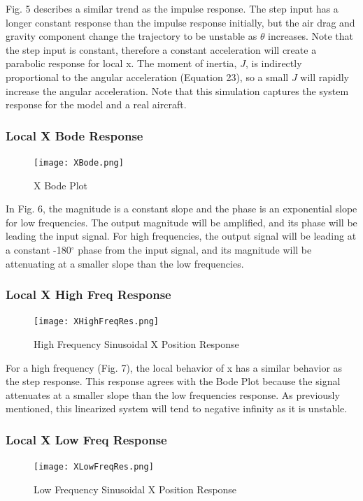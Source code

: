 \documentclass[conference]{IEEEtran}
\begin{document}
Fig. 5 describes a similar trend as the impulse response. The step input has a longer constant response than the impulse response initially, but the air drag and gravity component change the trajectory to be unstable as $\theta$ increases. Note that the step input is constant, therefore a constant acceleration will create a parabolic response for local x. The moment of inertia, $J$, is indirectly proportional to the angular acceleration (Equation 23), so a small $J$ will rapidly increase the angular acceleration. Note that this simulation captures the system response for the model and a real aircraft.  

\subsubsection{Local X Bode Response} 
\begin{figure}[htbp]
\centerline{\texttt{[image: XBode.png]}}
\caption{X Bode Plot}
\label{figure}
\end{figure}

In Fig. 6, the magnitude is a constant slope and the phase is an exponential slope for low frequencies. The output magnitude will be amplified, and its phase will be leading the input signal. For high frequencies, the output signal will be leading at a constant -180$^{\circ}$ phase from the input signal, and its magnitude will be attenuating at a smaller slope than the low frequencies. 


\newpage
\subsubsection{Local X High Freq Response}
\begin{figure}[htbp]
\centering
\centerline{\texttt{[image: XHighFreqRes.png]}}
\caption{High Frequency Sinusoidal X  Position Response}
\label{figure}
\end{figure}

For a high frequency (Fig. 7), the local behavior of x has a similar behavior as the step response. This response agrees with the Bode Plot because the signal attenuates at a smaller slope than the low frequencies response. As previously mentioned, this linearized system will tend to negative infinity as it is unstable. \\

\subsubsection{Local X Low Freq Response} 
\begin{figure}[htbp]
\centerline{\texttt{[image: XLowFreqRes.png]}}
\caption{Low Frequency Sinusoidal X Position Response}
\label{figure}
\end{figure}
\end{document}
